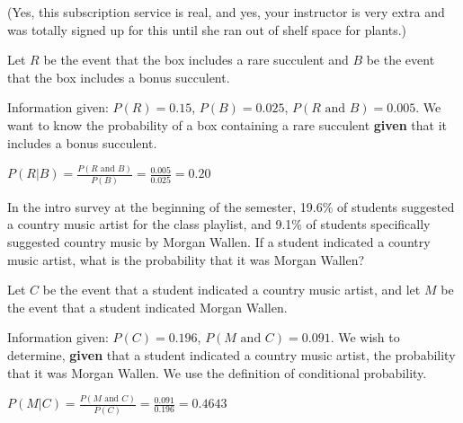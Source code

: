 \documentclass[noanswers]{exam}
\begin{document}
\begin{questions}
\begin{solution}[\stretch{1}]
	\vspace{3mm}
	
	(Yes, this subscription service is real, and yes, your instructor is very extra and was totally signed up for this until she ran out of shelf space for plants.) 
	
	\vspace{3mm}
	
	Let $R$ be the event that the box includes a rare succulent and $B$ be the event that the box includes a bonus succulent.
	
	\vspace{3mm}
	
	Information given: $P(R)=0.15$, $P(B)=0.025$, $P(R\text{ and }B)=0.005$. We want to know the probability of a box containing a rare succulent \textbf{given} that it includes a bonus succulent.
	
	\vspace{3mm}
	
	$P(R|B)=\displaystyle\frac{P(R\text{ and }B)}{P(B)}=\frac{0.005}{0.025}=0.20$
	
	\vspace{3mm}
	
	\end{solution}
	
	\question In the intro survey at the beginning of the semester, 19.6\% of students suggested a country music artist for the class playlist, and 9.1\% of students specifically suggested country music by Morgan Wallen. If a student indicated a country music artist, what is the probability that it was Morgan Wallen?
	
	\begin{solution}[\stretch{1}]
	
	\vspace{3mm}
	
	Let $C$ be the event that a student indicated a country music artist, and let $M$ be the event that a student indicated Morgan Wallen.
	
	\vspace{3mm}
	
	Information given: $P(C)=0.196$, $P(M\text{ and }C)=0.091$. We wish to determine, \textbf{given} that a student indicated a country music artist, the probability that it was Morgan Wallen. We use the definition of conditional probability.
	
	\vspace{3mm}
	
	$P(M|C)=\displaystyle\frac{P(M\text{ and }C)}{P(C)}=\frac{0.091}{0.196}=0.4643$
	
	\vspace{3mm}
	
	\end{solution}
	
\end{questions}

\end{document}
